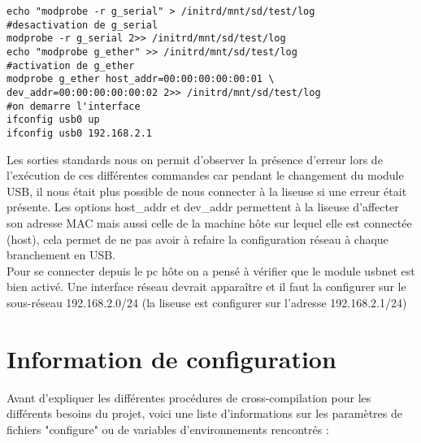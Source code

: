 \begin{lstlisting}
echo "modprobe -r g_serial" > /initrd/mnt/sd/test/log
#desactivation de g_serial
modprobe -r g_serial 2>> /initrd/mnt/sd/test/log
echo "modprobe g_ether" >> /initrd/mnt/sd/test/log
#activation de g_ether
modprobe g_ether host_addr=00:00:00:00:00:01 \
dev_addr=00:00:00:00:00:02 2>> /initrd/mnt/sd/test/log
#on demarre l'interface
ifconfig usb0 up
ifconfig usb0 192.168.2.1
\end{lstlisting}		

Les sorties standards nous on permit d'observer la présence d'erreur lors de l'exécution de ces différentes commandes car pendant le changement du module USB, il nous était plus possible de nous connecter à la liseuse si une erreur était présente.
Les options host_addr et dev_addr permettent à la liseuse d'affecter son adresse MAC mais aussi celle de la machine hôte sur lequel elle est connectée (host), cela permet de ne pas avoir à refaire la configuration réseau à chaque branchement en USB.	\\
	Pour se connecter depuis le pc hôte on a pensé à vérifier que le module usbnet est bien activé.	
	Une interface réseau devrait apparaître et il faut la configurer sur le sous-réseau 192.168.2.0/24 (la liseuse est configurer sur l'adresse 192.168.2.1/24)

\newpage

\section{Information de configuration}

Avant d'expliquer les différentes procédures de cross-compilation pour les différents besoins du projet, voici une liste d'informations sur les paramètres de fichiers "configure" ou de variables d'environnements rencontrés :

